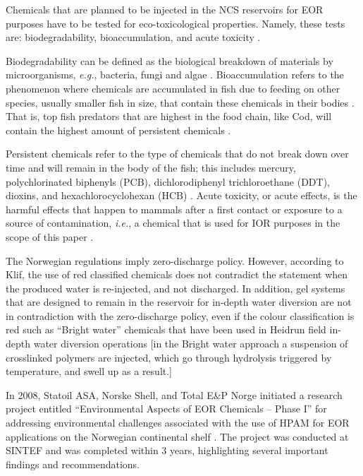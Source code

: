 Chemicals that are planned to be injected in the NCS reservoirs for EOR purposes have to be tested for eco-toxicological properties. Namely, these tests are: biodegradability, bioaccumulation, and acute toxicity \citep{Force2012}.

Biodegradability can be defined as the biological breakdown of materials by microorganisms, \textit{e.g.}, bacteria, fungi and algae \citep{Leja2010}. Bioaccumulation refers to the phenomenon where chemicals are accumulated in fish due to feeding on other species, usually smaller fish in size, that contain these chemicals in their bodies \citep{Beek2000}. That is, top fish predators that are highest in the food chain, like Cod, will contain the highest amount of persistent chemicals \citep{Koster2001}. 

Persistent chemicals refer to the type of chemicals that do not break down over time and will remain in the body of the fish; this includes mercury, polychlorinated biphenyls (PCB), dichlorodiphenyl trichloroethane (DDT), dioxins, and hexachlorocyclohexan (HCB) \citep{Adedipe2010}. Acute toxicity, or acute effects, is the harmful effects that happen to mammals after a first contact or exposure to a source of contamination, \textit{i.e.}, a chemical that is used for IOR purposes in the scope of this paper \citep{Cheremisinoff1996}.

The Norwegian regulations imply zero-discharge policy. However, according to Klif, the use of red classified chemicals does not contradict the statement when the produced water is re-injected, and not discharged. In addition, gel systems that are designed to remain in the reservoir for in-depth water diversion are not in contradiction with the zero-discharge policy, even if the colour classification is red such as “Bright water” chemicals that have been used in Heidrun field in-depth water diversion operations \citep{Am2010} [in the Bright water approach a suspension of crosslinked polymers are injected, which go through hydrolysis triggered by temperature, and swell up as a result.]

In 2008, Statoil ASA, Norske Shell, and Total E\&P Norge initiated a research project entitled “Environmental Aspects of EOR Chemicals – Phase I” for addressing environmental challenges associated with the use of HPAM for EOR applications on the Norwegian continental shelf \citep{Force2012}. The project was conducted at SINTEF and was completed within 3 years, highlighting several important findings and recommendations. 

